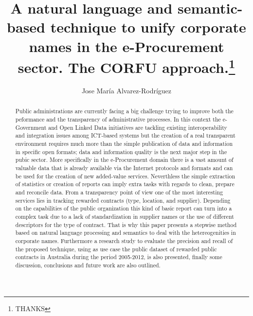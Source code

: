 \documentclass{llncs}
\begin{document}
\title{A natural language and semantic-based technique to unify corporate names in the e-Procurement sector. The CORFU approach.\thanks{THANKS}}

\titlerunning{}

\author{Jose Mar\'{i}a Alvarez-Rodr\'{i}guez} 







\date{}

\maketitle

\renewcommand{\labelitemi}{$\bullet$}

\begin{abstract}
Public administrations are currently facing a big challenge trying to improve both the peformance and the transparency of administrative processes.
In this context the e-Government and Open Linked Data initiatives are tackling existing interoperability and 
integration issues among ICT-based systems but the creation of a real transparent environment requires 
much more than the simple publication of data and information in specific open formats; data and information 
quality is the next major step in the pubic sector. More specifically in the e-Procurement domain there is a 
vast amount of valuable data that is already available via the Internet protocols and formats and can be used 
for the creation of new added-value services. Neverthless the simple extraction of statistics or creation of reports 
can imply extra tasks with regards to clean, prepare and reconcile data. 
From a transparency point of view one of the most interesting services lies in tracking rewarded contracts (type, location, and supplier). 
Depending on the capabilities of the public organization this kind of basic report can turn into a 
complex task due to a lack of standardization in supplier names or the use of different descriptors for the type of contract. That is why 
this paper presents a stepwise method based on natural language processing and semantics to deal with the hetereogenities in corporate names. 
Furthermore a research study to evaluate the precision and recall of the proposed technique, using as use case the public dataset of rewarded public 
contracts in Australia during the period 2005-2012, is also presented, finally some discussion, conclusions and future work 
are also outlined.
\end{abstract}
\end{document}
